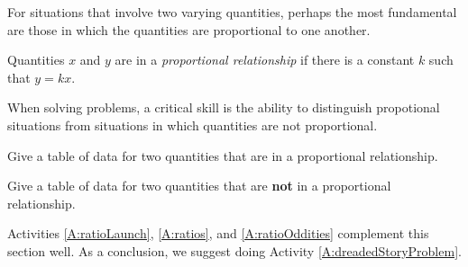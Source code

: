 For situations that involve two varying quantities, perhaps the most fundamental are those in which the quantities are proportional to one another.  
\begin{definition}
Quantities $x$ and $y$ are in a \emph{proportional relationship} if there is a constant $k$ such that $y=kx$.  
\end{definition}
When solving problems, a critical skill is the ability to distinguish propotional situations from situations in which quantities are not proportional.  
\begin{question}
Give a table of data for two quantities that are in a proportional relationship.  
\end{question}
\QM

\begin{question}
Give a table of data for two quantities that are \textbf{not} in a proportional relationship.  
\end{question}
\QM


\begin{activitynote}
Activities \ref{A:ratioLaunch}, \ref{A:ratios},  and \ref{A:ratioOddities} complement this section well. 
As a conclusion, we suggest doing Activity \ref{A:dreadedStoryProblem}.
\end{activitynote}

